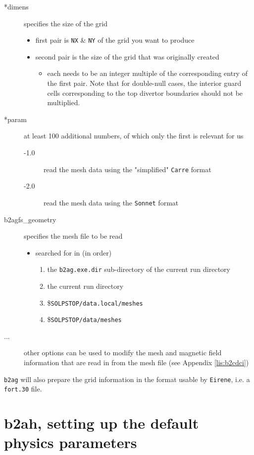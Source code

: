 \documentclass[a4paper,10pt]{report}
\begin{document}
\begin{description}
\item[*dimens] specifies the size of the grid
  \begin{itemize}
  \item first pair is {\tt NX} \& {\tt NY} of the grid you want to produce
  \item second pair is the size of the grid that was originally created
    \begin{itemize}
    \item each needs to be an integer multiple of the corresponding
      entry of the first pair. Note that for double-null cases, the interior
      guard cells corresponding to the top divertor boundaries should not be
      multiplied.
    \end{itemize}
  \end{itemize}
\item[*param] at least 100 additional numbers, of which only the first
  is relevant for us
  \begin{description}
  \item[-1.0] read the mesh data using the "simplified" {\tt Carre} format
  \item[-2.0] read the mesh data using the {\tt Sonnet} format
  \end{description}
\item[b2agfs\_geometry] specifies the mesh file to be read
  \begin{itemize}
  \item searched for in (in order)
    \begin{enumerate}
    \item the {\tt b2ag.exe.dir} sub-directory of the current run
      directory
    \item the current run directory
    \item \${\tt SOLPSTOP/data.local/meshes}
    \item \${\tt SOLPSTOP/data/meshes}
    \end{enumerate}
  \end{itemize}
\item[...] other options can be used to modify the mesh and magnetic
  field information that are read in from the mesh file (see Appendix \ref{lis:b2cdci})
\end{description}

{\tt b2ag} will also prepare the grid information in the format usable by {\tt Eirene},
i.e. a {\tt fort.30} file.

\newpage\section{b2ah, setting up the default physics parameters}
\label{sec:b2ah}
\end{document}
